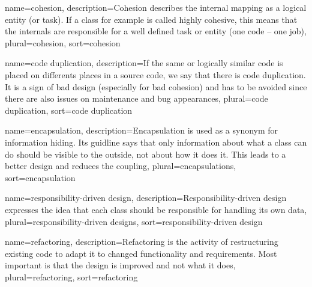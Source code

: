 {
	name=cohesion,
	description={Cohesion describes the internal mapping as a 
		logical entity (or task). If a class for example is
		called highly cohesive, this means that the internals
		are responsible for a well defined task or entity 
		(one code -- one job)},
	plural=cohesion,
	sort=cohesion
}

{
	name={code duplication},
	description={If the same or logically similar code is placed
		on differents places in a source code, we say that there
		is code duplication. It is a sign of bad design 
		(especially for bad cohesion) and has
		to be avoided since there are also issues on maintenance
		and bug appearances},
	plural={code duplication},
	sort={code duplication}
}

{
	name=encapsulation,
	description={Encapsulation is used as a synonym for 
		\gls{information hiding}. Its guidline says that only
		information about what a class can do should be visible
		to the outside, not about how it does it. This leads
		to a better design and reduces the coupling},
	plural=encapsulations,
	sort=encapsulation
}

{
	name={responsibility-driven design},
	description={Responsibility-driven design expresses the idea that
		each class should be responsible for handling its own
		data},
	plural={responsibility-driven designs},
	sort={responsibility-driven design}
}

{
	name=refactoring,
	description={Refactoring is the activity of restructuring
		existing code to adapt it to changed functionality and
		requirements. Most important is that the design is 
		improved and not what it does},
	plural=refactoring,
	sort=refactoring
}



